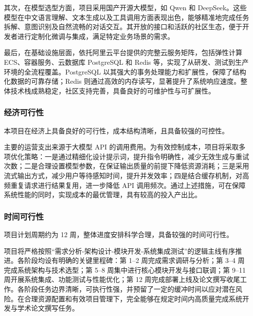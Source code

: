\par 其次，在模型选型方面，项目采用国产开源大模型，如 Qwen 和 DeepSeek。这些模型在中文语言理解、文本生成以及工具调用方面表现出色，能够精准地完成任务拆解、意图识别及自然流畅的对话交互。其开放的接口和活跃的社区生态，便于开发者进行定制化微调与集成，满足特定业务场景的需求。

\par 最后，在基础设施层面，依托阿里云平台提供的完整云服务矩阵，包括弹性计算 ECS、容器服务、云数据库 PostgreSQL 和 Redis 等，实现了从研发、测试到生产环境的全流程覆盖。PostgreSQL 以其强大的事务处理能力和扩展性，保障了结构化数据的可靠存储；Redis 则通过高效的内存读写，显著提升了系统响应速度。整体技术栈成熟稳定，社区支持完善，具备良好的可维护性与可扩展性。

\subsubsection{经济可行性}

\par 本项目在经济上具备良好的可行性，成本结构清晰，且具备较强的可控性。

\par 主要的运营支出来源于大模型 API 的调用费用。为有效控制成本，项目将采取多项优化策略：一是通过精细化设计提示词，提升指令明确性，减少无效生成与重试次数；二是合理设置模型参数，在保证输出质量的前提下降低资源消耗；三是采用流式输出方式，减少用户等待感知时间，提升并发效率；四是结合缓存机制，对高频重复请求进行结果复用，进一步降低 API 调用频次。通过上述措施，可在保障系统性能的同时，实现成本的最优管理，具有较高的投入产出比。

\subsubsection{时间可行性}

\par 项目计划周期约为 12 周，整体进度安排科学合理，具备较强的时间可行性。

\par 项目将严格按照“需求分析-架构设计-模块开发-系统集成测试”的逻辑主线有序推进。各阶段均设有明确的关键里程碑：第 1–2 周完成需求调研与分析；第 3–4 周完成系统架构与技术选型；第 5–8 周集中进行核心模块开发与接口联调；第 9–11 周开展系统集成、功能测试与性能优化；第 12 周完成部署上线及论文撰写收尾工作。各阶段任务边界清晰，可执行性强，并预留了一定的缓冲时间以应对潜在风险。在合理资源配置和有效项目管理下，完全能够在规定时间内高质量完成系统开发与学术论文撰写任务。